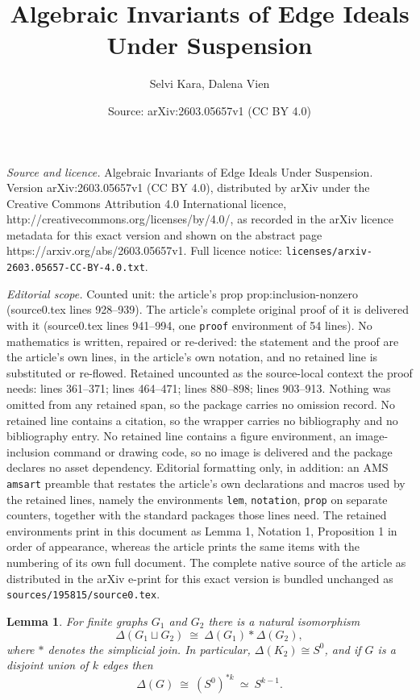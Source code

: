 \documentclass[10pt,a4paper]{amsart}
\title{Algebraic Invariants of Edge Ideals Under Suspension}
\author{Selvi Kara, Dalena Vien}
\date{Source: arXiv:2603.05657v1 (CC BY 4.0)}
\newtheorem{lem}{Lemma}
\begin{document}
\maketitle

\noindent\emph{Source and licence.} Algebraic Invariants of Edge Ideals Under Suspension. Version arXiv:2603.05657v1 (CC BY 4.0), distributed by arXiv under the Creative Commons Attribution 4.0 International licence, http://creativecommons.org/licenses/by/4.0/, as recorded in the arXiv licence metadata for this exact version and shown on the abstract page https://arxiv.org/abs/2603.05657v1. Full licence notice: \texttt{licenses/arxiv-2603.05657-CC-BY-4.0.txt}.\par\smallskip

\noindent\textit{Editorial scope.} Counted unit: the article's prop prop:inclusion-nonzero (source0.tex lines 928--939). The article's complete original proof of it is delivered with it (source0.tex lines 941--994, one \texttt{proof} environment of 54 lines). No mathematics is written, repaired or re-derived: the statement and the proof are the article's own lines, in the article's own notation, and no retained line is substituted or re-flowed.  Retained uncounted as the source-local context the proof needs: lines 361--371; lines 464--471; lines 880--898; lines 903--913.  Nothing was omitted from any retained span, so the package carries no omission record.  No retained line contains a citation, so the wrapper carries no bibliography and no bibliography entry.  No retained line contains a figure environment, an image-inclusion command or drawing code, so no image is delivered and the package declares no asset dependency.  Editorial formatting only, in addition: an AMS \texttt{amsart} preamble that restates the article's own declarations and macros used by the retained lines, namely the environments \texttt{lem}, \texttt{notation}, \texttt{prop} on separate counters, together with the standard packages those lines need.  The retained environments print in this document as Lemma 1, Notation 1, Proposition 1 in order of appearance, whereas the article prints the same items with the numbering of its own full document.  The complete native source of the article as distributed in the arXiv e-print for this exact version is bundled unchanged as \texttt{sources/195815/source0.tex}.
\begin{lem}\label{lem:ind-join}
For finite graphs $G_1$ and $G_2$ there is a natural isomorphism
\[
  \Delta(G_1\sqcup G_2)\ \cong\ \Delta(G_1)*\Delta(G_2),
\]
where $*$ denotes the simplicial join.
In particular, $\Delta(K_2)\cong S^0$, and if $G$ is a disjoint union of $k$ edges then
\[
  \Delta(G)\ \cong\ (S^0)^{*k}\ \simeq\ S^{k-1}.
\]
\end{lem}
\end{document}
